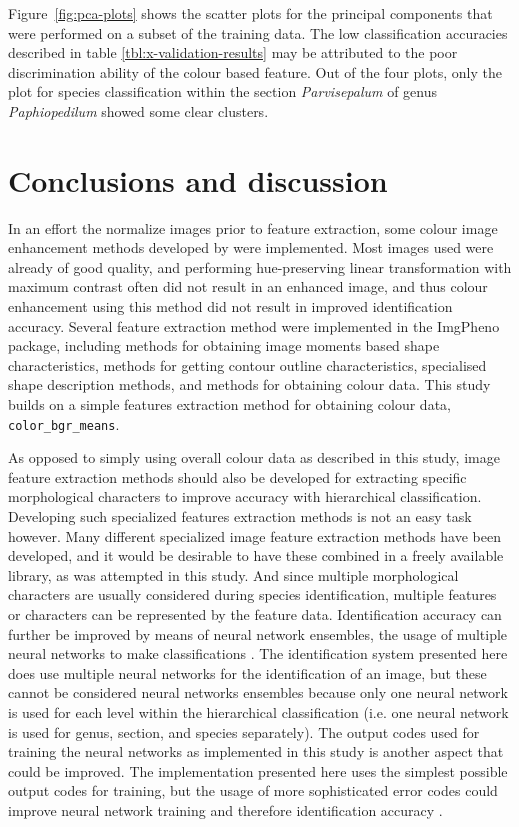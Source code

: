 \documentclass[3p,twocolumn,10pt]{elsarticle}
\begin{document}
Figure~\ref{fig:pca-plots} shows the scatter plots for the principal components that were performed on a subset of the training data. The low classification accuracies described in table \ref{tbl:x-validation-results} may be attributed to the poor discrimination ability of the colour based feature. Out of the four plots, only the plot for species classification within the section \textit{Parvisepalum} of genus \textit{Paphiopedilum} showed some clear clusters.

\section{Conclusions and discussion}
\label{sec:conclusion}

In an effort the normalize images prior to feature extraction, some colour image enhancement methods developed by \citet{Naik2003} were implemented. Most images used were already of good quality, and performing hue-preserving linear transformation with maximum contrast often did not result in an enhanced image, and thus colour enhancement using this method did not result in improved identification accuracy. Several feature extraction method were implemented in the ImgPheno package, including methods for obtaining image moments based shape characteristics, methods for getting contour outline characteristics, specialised shape description methods, and methods for obtaining colour data. This study builds on a simple features extraction method for obtaining colour data, \verb/color_bgr_means/.

As opposed to simply using overall colour data as described in this study, image feature extraction methods should also be developed for extracting specific morphological characters to improve accuracy with hierarchical classification. Developing such specialized features extraction methods is not an easy task however. Many different specialized image feature extraction methods have been developed, and it would be desirable to have these combined in a freely available library, as was attempted in this study. And since multiple morphological characters are usually considered during species identification, multiple features or characters can be represented by the feature data. Identification accuracy can further be improved by means of neural network ensembles, the usage of multiple neural networks to make classifications \citep{Hansen1990}. The identification system presented here does use multiple neural networks for the identification of an image, but these cannot be considered neural networks ensembles because only one neural network is used for each level within the hierarchical classification (i.e. one neural network is used for genus, section, and species separately). The output codes used for training the neural networks as implemented in this study is another aspect that could be improved. The implementation presented here uses the simplest possible output codes for training, but the usage of more sophisticated error codes could improve neural network training and therefore identification accuracy \citep{Dietterich1995}.
\end{document}
